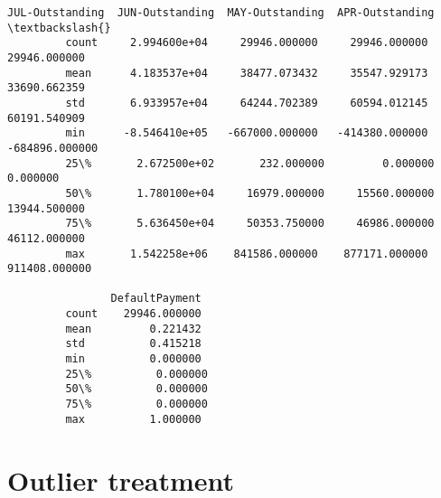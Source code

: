 \documentclass[11pt]{article}
\begin{document}
\begin{Verbatim}[commandchars=\\\{\}]
                JUL-Outstanding  JUN-Outstanding  MAY-Outstanding  APR-Outstanding  \textbackslash{}
         count     2.994600e+04     29946.000000     29946.000000     29946.000000   
         mean      4.183537e+04     38477.073432     35547.929173     33690.662359   
         std       6.933957e+04     64244.702389     60594.012145     60191.540909   
         min      -8.546410e+05   -667000.000000   -414380.000000   -684896.000000   
         25\%       2.672500e+02       232.000000         0.000000         0.000000   
         50\%       1.780100e+04     16979.000000     15560.000000     13944.500000   
         75\%       5.636450e+04     50353.750000     46986.000000     46112.000000   
         max       1.542258e+06    841586.000000    877171.000000    911408.000000   
         
                DefaultPayment  
         count    29946.000000  
         mean         0.221432  
         std          0.415218  
         min          0.000000  
         25\%          0.000000  
         50\%          0.000000  
         75\%          0.000000  
         max          1.000000  
\end{Verbatim}
            
    \section{Outlier treatment}\label{outlier-treatment}
\end{document}
